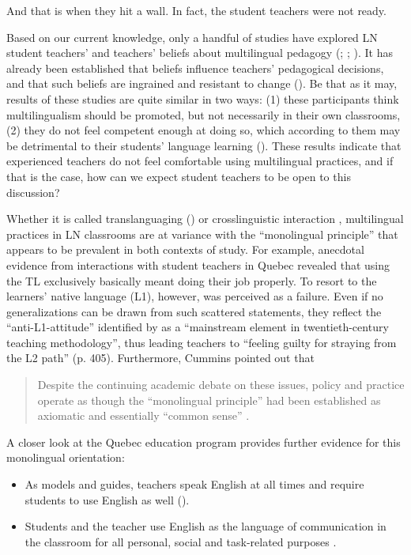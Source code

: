 \documentclass[output=paper]{../langscibook}
\begin{document}
And that is when they hit a wall. In fact, the student teachers were not ready.

Based on our current knowledge, only a handful of studies have explored LN student teachers’ and teachers’ beliefs about multilingual pedagogy (\citealt{ArocenaEgañaEtAl2015}; \citealt{CreeseBlackledge2010}; \citealt{DeAngelis2011,Haukås2016,Woll2020}). It has already been established that beliefs influence teachers’ pedagogical decisions, and that such beliefs are ingrained and resistant to change (\citealt{PhippsBorg2009}). Be that as it may, results of these studies are quite similar in two ways: (1) these participants think multilingualism should be promoted, but not necessarily in their own classrooms, (2) they do not feel competent enough at doing so, which according to them may be detrimental to their students’ language learning (\citealt{DeAngelis2011}). These results indicate that experienced teachers do not feel comfortable using multilingual practices, and if that is the case, how can we expect student teachers to be open to this discussion?

Whether it is called translanguaging (\citealt{GarciaLi2014}) or crosslinguistic interaction \citep{Jessner2008}, multilingual practices in LN classrooms are at variance with the “monolingual principle” \citep{Cummins2007} that appears to be prevalent in both contexts of study. For example, anecdotal evidence from interactions with student teachers in Quebec revealed that using the TL exclusively basically meant doing their job properly. To resort to the learners’ native language (L1), however, was perceived as a failure. Even if no generalizations can be drawn from such scattered statements, they reflect the “anti-L1-attitude” identified by \citet{Cook2001} as a “mainstream element in twentieth-century teaching methodology”, thus leading teachers to “feeling guilty for straying from the L2 path” (p. 405). Furthermore, Cummins pointed out that

\begin{quote}
Despite the continuing academic debate on these issues, policy and practice operate as though the “monolingual principle” had been established as axiomatic and essentially “common sense” \citep[224]{Cummins2007}. 
\end{quote}

A closer look at the Quebec education program provides further evidence for this monolingual orientation:

\begin{itemize}
\item  As models and guides, teachers speak English at all times and require students to use English as well (\citealt[7]{MEQ2007}).
\item Students and the teacher use English as the language of communication in the classroom for all personal, social and task-related purposes \citep{MEQ2007}.
\end{itemize}
\end{document}
